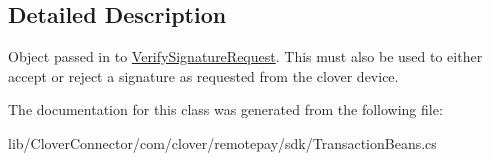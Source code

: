 \subsection{Detailed Description}
Object passed in to \hyperlink{classcom_1_1clover_1_1remotepay_1_1sdk_1_1_verify_signature_request}{Verify\+Signature\+Request}. This must also be used to either accept or reject a signature as requested from the clover device. 



The documentation for this class was generated from the following file\+:\begin{DoxyCompactItemize}
\item 
lib/\+Clover\+Connector/com/clover/remotepay/sdk/Transaction\+Beans.\+cs\end{DoxyCompactItemize}
